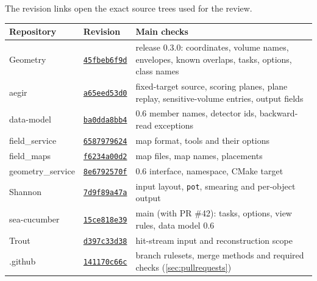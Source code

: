 The revision links open the exact source trees used for the review.
\begin{center}\small
\begin{tabularx}{\linewidth}{l l L}
\toprule Repository & Revision & Main checks \\ \midrule
Geometry & \href{https://github.com/ShipSoft/Geometry/tree/45fbeb6f9dcbdfa0b6116112200cc089f7b784c8}{\texttt{45fbeb6f9d}} & release 0.3.0: coordinates, volume names, envelopes, known overlaps, tasks,  options, class names \\
aegir & \href{https://github.com/ShipSoft/aegir/tree/a65eed53d03ce14b68df49d3f922c04c283367d3}{\texttt{a65eed53d0}} & fixed-target source, scoring planes, plane replay, sensitive-volume entries, output fields \\
data-model & \href{https://github.com/ShipSoft/data-model/tree/ba0dda8bb4b43b9d2a2ded3ede57bdb519ae8d12}{\texttt{ba0dda8bb4}} & 0.6 member names, detector ids, backward-read exceptions \\
field\_service & \href{https://github.com/ShipSoft/field_service/tree/6587979624a98713e5c7045b69b4be39f6dc1797}{\texttt{6587979624}} & map format, tools and their options \\
field\_maps & \href{https://github.com/ShipSoft/field_maps/tree/f6234a00d2d5b2b257df410cd7c1459ad3bc236e}{\texttt{f6234a00d2}} & map files, map names, placements \\
geometry\_service & \href{https://github.com/ShipSoft/geometry_service/tree/8e6792570fad3dce7349aeb992e734f860b1356f}{\texttt{8e6792570f}} & 0.6 interface, namespace, CMake target \\
Shannon & \href{https://github.com/ShipSoft/Shannon/tree/7d9f89a47a09c6865124e532c49ef9206661da57}{\texttt{7d9f89a47a}} & input layout, \texttt{pot}, smearing and per-object output \\
sea-cucumber & \href{https://github.com/ShipSoft/sea-cucumber/tree/15ce818e39d8d21d508bd9dc327a706b738f7125}{\texttt{15ce818e39}} & main (with PR \#42): tasks, options, view rules, data model 0.6 \\
Trout & \href{https://github.com/ShipSoft/Trout/tree/d397c33d38108e7beaf4e32d9c46b7151200e886}{\texttt{d397c33d38}} & hit-stream input and reconstruction scope \\
.github & \href{https://github.com/ShipSoft/.github/tree/141170c66caa785af6b5cf30551359dc47e994c1}{\texttt{141170c66c}} & branch rulesets, merge methods and required checks (\cref{sec:pullrequests}) \\
\bottomrule\end{tabularx}\end{center}

